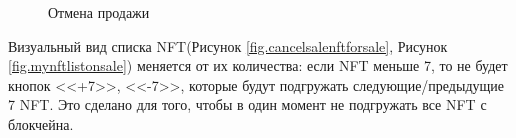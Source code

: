 \begin{figure}[H]
    \centering
    \caption{Отмена продажи}
\end{figure}

\begin{remark}
    Визуальный вид списка NFT(Рисунок {\color{blue} \ref{fig.cancelsalenftforsale}}, Рисунок {\color{blue} \ref{fig.mynftlistonsale}}) меняется от их количества: если NFT меньше 7, то не будет кнопок <<+7>>, <<-7>>, которые будут подгружать следующие/предыдущие 7 NFT. Это сделано для того, чтобы в один момент не подгружать все NFT с блокчейна.

\end{remark}

